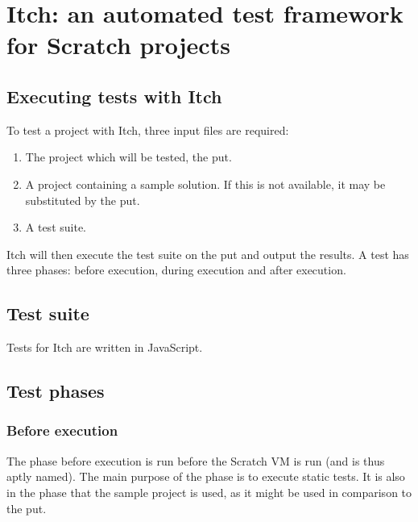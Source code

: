 \documentclass[main]{subfiles}
\begin{document}
\chapter{Itch: an automated test framework for Scratch projects}
\label{ch:itch:-an-automated-test-framework-for-scratch-projects}




\section{Executing tests with Itch}\label{sec:executing-tests-with-itch}


To test a project with Itch, three input files are required:

\begin{enumerate}
    \item The project which will be tested, the \acrfull{put}.
    \item A project containing a sample solution.
          If this is not available, it may be substituted by the \acrshort{put}.
    \item A test suite.
\end{enumerate}

Itch will then execute the test suite on the \acrshort{put} and output the results.
A test has three phases: before execution, during execution and after execution.


\section{Test suite}\label{sec:test-suite}

Tests for Itch are written in JavaScript.

\section{Test phases}\label{sec:test-phases}

\subsection{Before execution}\label{subsec:before-execution}

The phase before execution is run before the Scratch VM is run (and is thus aptly named).
The main purpose of the phase is to execute static tests.
It is also in the phase that the sample project is used, as it might be used in comparison to the \acrshort{put}.
\end{document}
